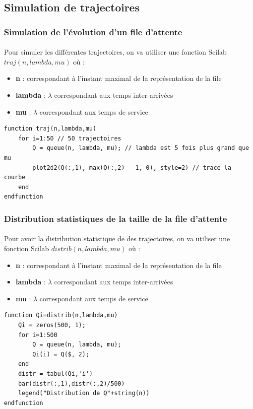 \documentclass{article}
\begin{document}
\subsection{Simulation de trajectoires}

\subsubsection{Simulation de l'évolution d'un file d'attente}
\paragraph{}
Pour simuler les différentes trajectoires, on va utiliser une fonction Scilab $traj(n,lambda,mu)$ où :
\begin{itemize}
	\item \textbf{n} : correspondant à l'instant maximal de la représentation de la file
	\item \textbf{lambda} : $\lambda$ correspondant aux temps inter-arrivées
	\item \textbf{mu} :  $\lambda$ correspondant aux temps de service
\end{itemize}
\begin{verbatim}
function traj(n,lambda,mu)
    for i=1:50 // 50 trajectoires
        Q = queue(n, lambda, mu); // lambda est 5 fois plus grand que mu
        plot2d2(Q(:,1), max(Q(:,2) - 1, 0), style=2) // trace la courbe
    end
endfunction
\end{verbatim}

\subsubsection{Distribution statistiques de la taille de la file d'attente}
\paragraph{}
Pour avoir la distribution statistique de des trajectoires, on va utiliser une fonction Scilab $distrib(n,lambda,mu)$ où :
\begin{itemize}
	\item \textbf{n} : correspondant à l'instant maximal de la représentation de la file
	\item \textbf{lambda} : $\lambda$ correspondant aux temps inter-arrivées
	\item \textbf{mu} :  $\lambda$ correspondant aux temps de service
\end{itemize}
\begin{verbatim}
function Qi=distrib(n,lambda,mu)
    Qi = zeros(500, 1);
    for i=1:500
        Q = queue(n, lambda, mu);
        Qi(i) = Q($, 2);
    end
    distr = tabul(Qi,'i')
    bar(distr(:,1),distr(:,2)/500)
    legend("Distribution de Q"+string(n))
endfunction
\end{verbatim}
\end{document}
